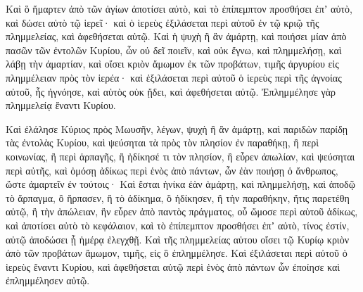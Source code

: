 {Καὶ ὃ ἥμαρτεν ἀπὸ τῶν ἁγίων ἀποτίσει αὐτὸ, καὶ τὸ ἐπίπεμπτον προσθήσει ἐπʼ αὐτὸ, καὶ δώσει αὐτὸ τῷ ἱερεῖ· καὶ ὁ ἱερεὺς ἐξιλάσεται περὶ αὐτοῦ ἐν τῷ κριῷ τῆς πλημμελείας, καὶ ἀφεθήσεται αὐτῷ.
Καὶ ἡ ψυχὴ ἣ ἂν ἁμάρτῃ, καὶ ποιήσει μίαν ἀπὸ πασῶν τῶν ἐντολῶν Κυρίου, ὧν οὐ δεῖ ποιεῖν, καὶ οὐκ ἔγνω, καὶ πλημμελήσῃ, καὶ λάβῃ τὴν ἁμαρτίαν,
καὶ οἴσει κριὸν ἄμωμον ἐκ τῶν προβάτων, τιμῆς ἀργυρίου εἰς πλημμέλειαν πρὸς τὸν ἱερέα· καὶ ἐξιλάσεται περὶ αὐτοῦ ὁ ἱερεὺς περὶ τῆς ἀγνοίας αὐτοῦ, ἧς ἠγνόησε, καὶ αὐτὸς οὐκ ᾔδει, καὶ ἀφεθήσεται αὐτῷ.
Ἐπλημμέλησε γὰρ πλημμελείᾳ ἔναντι Κυρίου.
\par }{\PP {}Καὶ ἐλάλησε Κύριος πρὸς Μωυσῆν, λέγων,
ψυχὴ ἣ ἂν ἁμάρτῃ, καὶ παριδὼν παρίδῃ τὰς ἐντολὰς Κυρίου, καὶ ψεύσηται τὰ πρὸς τὸν πλησίον ἐν παραθήκῃ, ἢ περὶ κοινωνίας, ἢ περὶ ἁρπαγῆς, ἢ ἠδίκησέ τι τὸν πλησίον,
ἢ εὗρεν ἀπωλίαν, καὶ ψεύσηται περὶ αὐτῆς, καὶ ὀμόσῃ ἀδίκως περὶ ἑνὸς ἀπὸ πάντων, ὧν ἐὰν ποιήσῃ ὁ ἄνθρωπος, ὥστε ἁμαρτεῖν ἐν τούτοις·
Καὶ ἔσται ἡνίκα ἐὰν ἁμάρτῃ, καὶ πλημμελήσῃ, καὶ ἀποδῷ τὸ ἅρπαγμα, ὃ ἥρπασεν, ἢ τὸ ἀδίκημα, ὃ ἠδίκησεν, ἢ τὴν παραθήκην, ἥτις παρετέθη αὐτῷ, ἢ τὴν ἀπώλειαν, ἣν εὗρεν
ἀπὸ παντὸς πράγματος, οὗ ὤμοσε περὶ αὐτοῦ ἀδίκως, καὶ ἀποτίσει αὐτὸ τὸ κεφάλαιον, καὶ τὸ ἐπίπεμπτον προσθήσει ἐπʼ αὐτὸ, τίνος ἐστίν, αὐτῷ ἀποδώσει ᾗ ἡμέρᾳ ἐλεγχθῇ.
Καὶ τῆς πλημμελείας αὐτου οἴσει τῷ Κυρίῳ κριὸν ἀπὸ τῶν προβάτων ἄμωμον, τιμῆς, εἰς ὃ ἐπλημμέλησε.
Καὶ ἐξιλάσεται περὶ αὐτοῦ ὁ ἱερεὺς ἔναντι Κυρίου, καὶ ἀφεθήσεται αὐτῷ περὶ ἑνὸς ἀπὸ πάντων ὧν ἐποίησε καὶ ἐπλημμέλησεν αὐτῷ.

}
